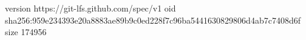version https://git-lfs.github.com/spec/v1
oid sha256:959e234393e20a8883ae89b9c0ed228f7c96ba5441630829806d4ab7c7408d6f
size 174956
